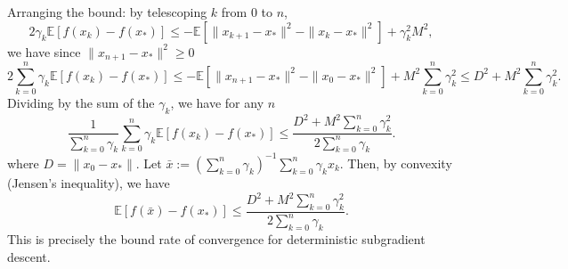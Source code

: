 Arranging the bound: by telescoping $k$ from $0$ to $n$,
\begin{equation}
2\gamma_k\mathbb{E}[f(x_k)-f(x_*)] \leq -\mathbb{E}[\|x_{k+1}-x_*\|^2-\|x_{k}-x_*\|^2] + \gamma_k^2 M^2,
\end{equation}
we have since $\|x_{n+1}-x_*\|^2\geq 0$
\begin{equation}
2\sum_{k=0}^n \gamma_k\mathbb{E}[f(x_k)-f(x_*)] \leq -\mathbb{E}[\|x_{n+1}-x_*\|^2-\|x_{0}-x_*\|^2] + M^2 \sum_{k=0}^{n} \gamma_k^2\leq D^2+M^2  \sum_{k=0}^{n} \gamma_k^2.
\end{equation}
Dividing by the sum of the $\gamma_k$, we have for any $n$
\begin{equation}
\frac{1}{\sum_{k=0}^n \gamma_k}\sum_{k=0}^n \gamma_k\mathbb{E}[f(x_k)-f(x_*)] \leq \frac{D^2+M^2  \sum_{k=0}^{n} \gamma_k^2}{2\sum_{k=0}^n \gamma_k}.
\end{equation}
where $D=\|x_0-x_*\|$. Let $\bar{x}:=(\sum_{k=0}^n \gamma_k)^{-1}\sum_{k=0}^n \gamma_k x_k$. Then, by convexity (Jensen's inequality), we have
\begin{equation}
\mathbb{E}[f(\bar{x})-f(x_*)] \leq \frac{D^2+M^2  \sum_{k=0}^{n} \gamma_k^2}{2\sum_{k=0}^n \gamma_k}.
\end{equation}
This is precisely the bound rate of convergence for deterministic subgradient descent.